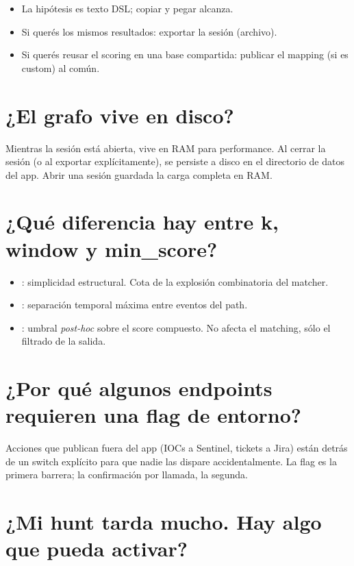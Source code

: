 \begin{itemize}
    \item La hipótesis es texto DSL; copiar y pegar alcanza.
    \item Si querés los mismos resultados: exportar la sesión
    (archivo).
    \item Si querés reusar el scoring en una base compartida:
    publicar el mapping (si es custom) al 
    común.
\end{itemize}

\section{¿El grafo vive en disco?}

Mientras la sesión está abierta, vive en RAM para performance. Al
cerrar la sesión (o al exportar explícitamente), se persiste a
disco en el directorio de datos del app. Abrir una sesión
guardada la carga completa en RAM.

\section{¿Qué diferencia hay entre k, window y min\_score?}

\begin{itemize}
    \item {}: simplicidad estructural. Cota de la explosión
    combinatoria del matcher.
    \item {}: separación temporal máxima entre eventos
    del path.
    \item {}: umbral \emph{post-hoc} sobre el score
    compuesto. No afecta el matching, sólo el filtrado de la
    salida.
\end{itemize}

\section{¿Por qué algunos endpoints requieren una flag de entorno?}

Acciones que publican fuera del app (IOCs a Sentinel, tickets a
Jira) están detrás de un switch explícito para que nadie las
dispare accidentalmente. La flag es la primera barrera; la
confirmación por llamada, la segunda.

\section{¿Mi hunt tarda mucho. Hay algo que pueda activar?}

